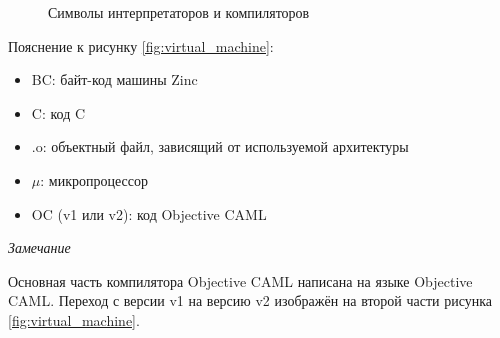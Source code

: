 \begin{figure}[h]
	\caption{\label{fig:graphical_notation_for_interpreters_and_compilers}
Символы интерпретаторов и компиляторов}
\end{figure}

Пояснение к рисунку \ref{fig:virtual_machine}:

\begin{itemize}
	\item BC: байт-код машины Zinc

	\item C: код C

	\item .o: объектный файл, зависящий от используемой архитектуры

	\item $\mu$: микропроцессор

	\item OC (v1 или v2): код Objective CAML
\end{itemize}


{\it Замечание}

Основная часть компилятора Objective CAML написана на языке Objective CAML.
Переход с версии v1 на версию v2 изображён на второй части рисунка
\ref{fig:virtual_machine}.
